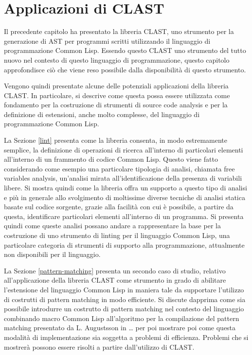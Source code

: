 \documentclass{book}
\begin{document}




\endgroup

\clearpage

\begingroup
\let\clearpage\relax

\chapter{Applicazioni di CLAST}
\label{applications}

Il precedente capitolo ha presentato la libreria CLAST, uno strumento per la
generazione di AST per programmi scritti utilizzando il linguaggio di
programmazione Common Lisp. Essendo questo CLAST uno strumento del tutto nuovo
nel contesto di questo linguaggio di programmazione, questo capitolo
approfondisce ciò che viene reso possibile dalla disponibilità di questo
strumento.

Vengono quindi presentate alcune delle potenziali applicazioni della libreria
CLAST. In particolare, si descrive come questa possa essere utilizzata come
fondamento per la costruzione di strumenti di source code analysis e per la
definizione di estensioni, anche molto complesse, del linguaggio di
programmazione Common Lisp.

La Sezione \ref{lint} presenta come la libreria consenta, in modo estremamente
semplice, la definizione di operazioni di ricerca all’interno di particolari
elementi all’interno di un frammento di codice Common Lisp. Questo viene fatto
considerando come esempio una particolare tipologia di analisi, chiamata free
variables analysis, un’analisi mirata all’identificazione della presenza di
variabili libere. Si mostra quindi come la libreria offra un supporto a questo
tipo di analisi e più in generale allo svolgimento di moltissime diverse
tecniche di analisi statica basate sul codice sorgente, grazie alla facilità con
cui è possibile, a partire da questa, identificare particolari elementi
all’interno di un programma. Si presenta quindi come queste analisi possano
andare a rappresentare la base per la costruzione di uno strumento di linting
per il linguaggio Common Lisp, una particolare categoria di strumenti di
supporto alla programmazione, attualmente non disponibili per il linguaggio.

La Sezione \ref{pattern-matching} presenta un secondo caso di studio, relativo
all’applicazione della libreria CLAST come strumento in grado di abilitare
l’estensione del linguaggio Common Lisp in maniera tale da supportare l’utilizzo
di costrutti di pattern matching in modo efficiente. Si discute dapprima come
sia possibile introdurre un costrutto di pattern matching nel contesto del
linguaggio combinando macro Common Lisp all’algoritmo per la compilazione del
pattern matching presentato da L. Augustsson in … per poi mostrare poi come
questa modalità di implementazione sia soggetta a problemi di efficienza.
Problemi che si mostrerà possono essere risolti a partire dall'utilizzo di
CLAST.
\end{document}
